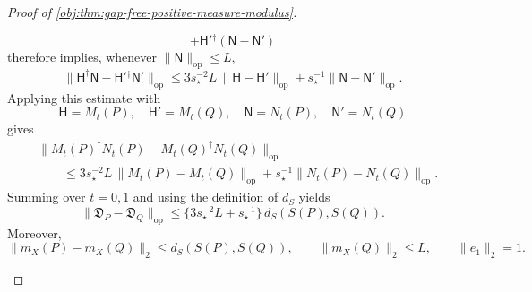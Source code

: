 \documentclass[11pt]{article}
\begin{document}
\begin{proof}[Proof of \cref{obj:thm:gap-free-positive-measure-modulus}]
\begin{enumerate}
\[+\mathsf H'{}^\dagger(\mathsf N-\mathsf N')
\]
therefore implies, whenever \(\|\mathsf N\|_{\mathrm{op}}\le L\),
\[
\|\mathsf H^\dagger\mathsf N-\mathsf H'{}^\dagger\mathsf N'\|_{\mathrm{op}}
\le
3s_\star^{-2}L\,\|\mathsf H-\mathsf H'\|_{\mathrm{op}}
+s_\star^{-1}\|\mathsf N-\mathsf N'\|_{\mathrm{op}} .
\]
Applying this estimate with
\[
\mathsf H=M_t(P),\quad \mathsf H'=M_t(Q),\quad
\mathsf N=N_t(P),\quad \mathsf N'=N_t(Q)
\]
gives
\[
\begin{aligned}
&\|M_t(P)^\dagger N_t(P)-M_t(Q)^\dagger N_t(Q)\|_{\mathrm{op}}\\
&\qquad\le
3s_\star^{-2}L\,\|M_t(P)-M_t(Q)\|_{\mathrm{op}}
+s_\star^{-1}\|N_t(P)-N_t(Q)\|_{\mathrm{op}} .
\end{aligned}
\]
Summing over \(t=0,1\) and using the definition of \(d_S\) yields
\[
\|\mathfrak D_P-\mathfrak D_Q\|_{\mathrm{op}}
\le
\{3s_\star^{-2}L+s_\star^{-1}\}\,
d_S(S(P),S(Q)).
\]
Moreover,
\[
\|m_X(P)-m_X(Q)\|_2\le d_S(S(P),S(Q)),
\qquad
\|m_X(Q)\|_2\le L,
\qquad
\|e_1\|_2=1 .
\]


\end{enumerate}
\end{proof}
\end{document}
